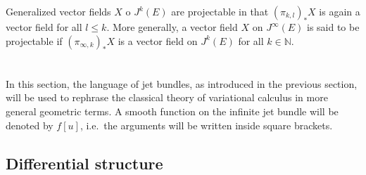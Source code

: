     \begin{property}
        Generalized vector fields $X$ o $J^k(E)$ are projectable in that $(\pi_{k,l})_\ast X$ is again a vector field for all $l\leq k$. More generally, a vector field $X$ on $J^\infty(E)$ is said to be projectable if $(\pi_{\infty,k})_\ast X$ is a vector field on $J^k(E)$ for all $k\in\mathbb{N}$.
    \end{property}

\section{}\label{section:variational_bicomplex}

    In this section, the language of jet bundles, as introduced in the previous section, will be used to rephrase the classical theory of variational calculus in more general geometric terms. A smooth function on the infinite jet bundle will be denoted by $f[u]$, i.e.~the arguments will be written inside square brackets.

\subsection{Differential structure}

